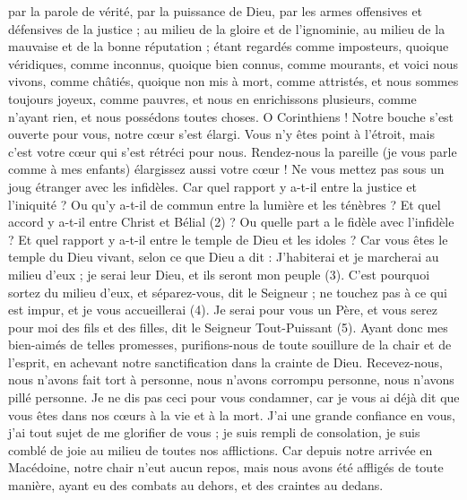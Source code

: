 \begin{multicols}{2}
par la parole de vérité, par la puissance de Dieu, par les armes offensives et défensives de la justice ;
au milieu de la gloire et de l'ignominie, au milieu de la mauvaise et de la bonne réputation ; étant regardés comme imposteurs, quoique véridiques,
comme inconnus, quoique bien connus, comme mourants, et voici nous vivons, comme châtiés, quoique non mis à mort,
comme attristés, et nous sommes toujours joyeux, comme pauvres, et nous en enrichissons plusieurs, comme n'ayant rien, et nous possédons toutes choses.
O Corinthiens ! Notre bouche s’est ouverte pour vous, notre cœur s'est élargi.
Vous n’y êtes point à l'étroit, mais c’est votre cœur qui s’est rétréci pour nous.
Rendez-nous la pareille (je vous parle comme à mes enfants) élargissez aussi votre cœur !
Ne vous mettez pas sous un joug étranger avec les infidèles. Car quel rapport y a-t-il entre la justice et l'iniquité ? Ou qu’y a-t-il de commun entre la lumière et les ténèbres ?
Et quel accord y a-t-il entre Christ et Bélial (2) ? Ou quelle part a le fidèle avec l'infidèle ?
Et quel rapport y a-t-il entre le temple de Dieu et les idoles ? Car vous êtes le temple du Dieu vivant, selon ce que Dieu a dit : J'habiterai et je marcherai au milieu d'eux ; je serai leur Dieu, et ils seront mon peuple (3).
C'est pourquoi sortez du milieu d'eux, et séparez-vous, dit le Seigneur ; ne touchez pas à ce qui est impur, et je vous accueillerai (4).
Je serai pour vous un Père, et vous serez pour moi des fils et des filles, dit le Seigneur Tout-Puissant (5).
\VerseOne{}Ayant donc mes bien-aimés de telles promesses, purifions-nous de toute souillure de la chair et de l'esprit, en achevant notre sanctification dans la crainte de Dieu.
Recevez-nous, nous n'avons fait tort à personne, nous n'avons corrompu personne, nous n'avons pillé personne.
Je ne dis pas ceci pour vous condamner, car je vous ai déjà dit que vous êtes dans nos cœurs à la vie et à la mort.
J'ai une grande confiance en vous, j'ai tout sujet de me glorifier de vous ; je suis rempli de consolation, je suis comblé de joie au milieu de toutes nos afflictions.
Car depuis notre arrivée en Macédoine, notre chair n’eut aucun repos, mais nous avons été affligés de toute manière, ayant eu des combats au dehors, et des craintes au dedans.

\end{multicols}
